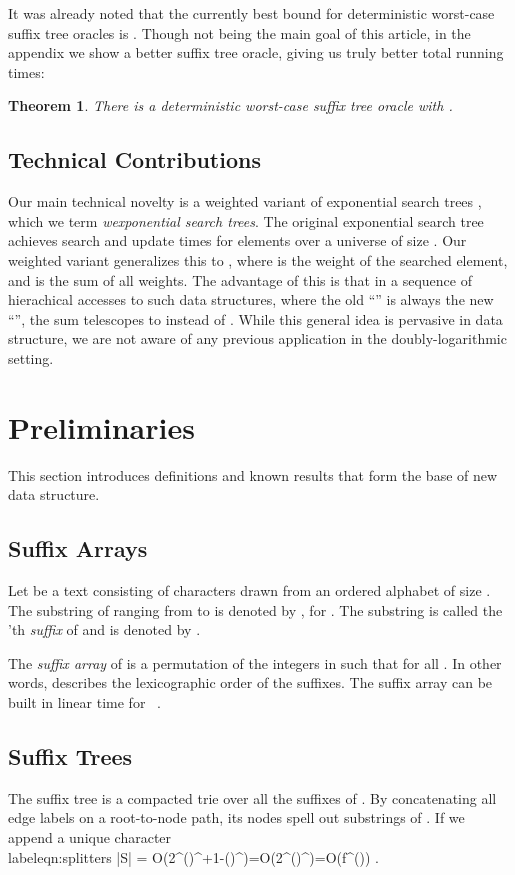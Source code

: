 \documentclass[11pt,onecolumn,final]{article} \usepackage{a4}
\theoremstyle{plain}
\newtheorem{theorem}[definition]{Theorem}
\theoremstyle{remark}
\begin{document}
It was already noted that the currently best bound \cite{Amir05towards} for deterministic worst-case suffix tree oracles is . Though not being the main goal of this article, in the appendix we show a better suffix tree oracle, giving us truly better total running times:

\begin{theorem}
  \label{thm:main3}
There is a deterministic worst-case suffix tree oracle with .
\end{theorem}

\subsection{Technical Contributions}
Our main technical novelty is a weighted variant of exponential search trees \cite{andersson07dynamic}, which we term \emph{wexponential search trees}. The original exponential search tree achieves  search and update times for  elements over a universe of size . Our weighted variant generalizes this to , where  is the weight of the searched element, and  is the sum of all weights. The advantage of this is that in a sequence of  hierachical accesses to such data structures, where the old ``'' is always the new ``'', the sum telescopes to  instead of . While this general idea is pervasive in data structure, we are not aware of any previous application in the doubly-logarithmic setting.

\section{Preliminaries}
\label{sect:preliminaries}
This section introduces definitions and known results that form the base of new data structure.

\subsection{Suffix Arrays}
Let  be a text consisting of  characters drawn from an ordered alphabet  of size . The substring of  ranging from  to  is denoted by , for . The substring  is called the 'th \emph{suffix} of  and is denoted by .

The \emph{suffix array}  of  is a permutation of the integers in  such that  for all . In other words,  describes the lexicographic order of the suffixes. The suffix array can be built in linear time for ~\cite{kaerkkaeinen06linear}.

\subsection{Suffix Trees}
The suffix tree  is a compacted trie over all the suffixes of . By concatenating all edge labels on a root-to-node path, its nodes spell out substrings of . If we append a unique character \not\in\SigmaTT\\label{eqn:splitters}
|S|  = O(2^{()^{\ell+1}-()^{\ell}})=O(2^{()^{\ell}})=O(f^{}(\ell)) .
\end{document}
